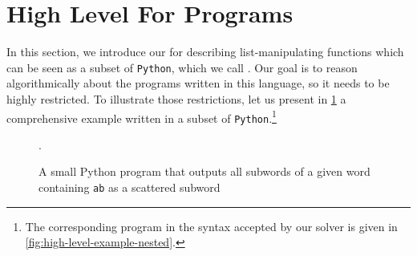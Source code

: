 \section{High Level For Programs}
\label{sec:high-level}

\AP In this section, we introduce our  for
describing list-manipulating functions which can be seen as a subset of
\texttt{Python}, which we call . Our goal is
to reason algorithmically about the programs written in this language, so it
needs to be highly restricted. To illustrate those restrictions, let us present
in \cref{fig:python-example-nested}
a comprehensive example written in a subset of \texttt{Python}.\footnote{The
corresponding program in the syntax accepted by our solver is given in
\cref{fig:high-level-example-nested}.}

\begin{figure}[h]
    \centering
    
    \caption{A small Python program that
        outputs all subwords of a given word containing \texttt{ab}
        as a scattered subword}.
    \label{fig:python-example-nested}
\end{figure}

